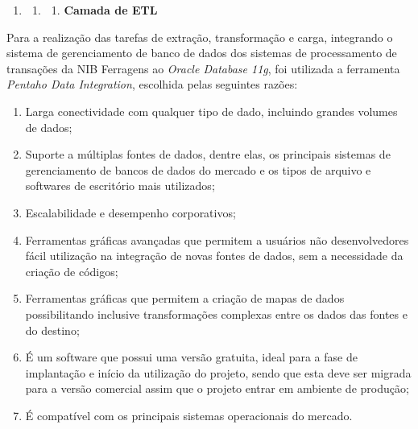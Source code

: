 \documentclass[a4paper]{article}
\newcommand\liststyleWWviiiNumi{%
\renewcommand\theenumi{\arabic{enumi}}
\renewcommand\theenumii{\arabic{enumi}.\arabic{enumii}}
\renewcommand\theenumiii{\arabic{enumi}.\arabic{enumii}.\arabic{enumiii}}
\renewcommand\theenumiv{\arabic{enumi}.\arabic{enumii}.\arabic{enumiii}.\arabic{enumiv}}
\renewcommand\labelenumi{\theenumi}
\renewcommand\labelenumii{\theenumii}
\renewcommand\labelenumiii{\theenumiii}
\renewcommand\labelenumiv{\theenumiv.}
}
\newcommand\liststyleWWviiiNumxxx{%
\renewcommand\theenumi{\alph{enumi}}
\renewcommand\theenumii{\alph{enumii}}
\renewcommand\theenumiii{\roman{enumiii}}
\renewcommand\theenumiv{\arabic{enumiv}}
\renewcommand\labelenumi{\theenumi)}
\renewcommand\labelenumii{\theenumii.}
\renewcommand\labelenumiii{\theenumiii.}
\renewcommand\labelenumiv{\theenumiv.}
}
\begin{document}
\bigskip


\bigskip

\liststyleWWviiiNumi
\begin{enumerate}
\item \begin{enumerate}
\item \begin{enumerate}
\item {
\textsf{\textbf{Camada de ETL}}}
\end{enumerate}
\end{enumerate}
\end{enumerate}
{
\textsf{Para a realiza\c{c}\~ao das tarefas de extra\c{c}\~ao, transforma\c{c}\~ao e carga, integrando o sistema de
gerenciamento de banco de dados dos sistemas de processamento de transa\c{c}\~oes da NIB Ferragens ao
}\textsf{\textit{Oracle Database 11g}}\textsf{, foi utilizada a ferramenta }\textsf{\textit{Pentaho Data
Integration}}\textsf{, escolhida pelas seguintes raz\~oes:}}

\liststyleWWviiiNumxxx
\begin{enumerate}
\item {
\textsf{Larga conectividade com qualquer tipo de dado, incluindo grandes volumes de dados;}}
\item {
\textsf{Suporte a m\'ultiplas fontes de dados, dentre elas, os principais sistemas de gerenciamento de bancos de dados
do mercado e os tipos de arquivo e softwares de escrit\'orio mais utilizados;}}
\item {\sffamily
Escalabilidade e desempenho corporativos;}
\item {
\textsf{Ferramentas gr\'aficas avan\c{c}adas que permitem a usu\'arios n\~ao desenvolvedores f\'acil utiliza\c{c}\~ao na
integra\c{c}\~ao de novas fontes de dados, sem a necessidade da cria\c{c}\~ao de c\'odigos;}}
\item {\sffamily
Ferramentas gr\'aficas que permitem a cria\c{c}\~ao de mapas de dados possibilitando inclusive transforma\c{c}\~oes
complexas entre os dados das fontes e do destino;}
\item {
\textsf{\'E um software que possui uma vers\~ao gratuita, ideal para a fase de implanta\c{c}\~ao e in\'icio da
utiliza\c{c}\~ao do projeto, sendo que esta deve ser migrada para a vers\~ao comercial assim que o projeto entrar em
ambiente de produ\c{c}\~ao;}}
\item {
\textsf{\'E compat\'ivel com os principais sistemas operacionais do mercado. }}
\end{enumerate}
\end{document}
